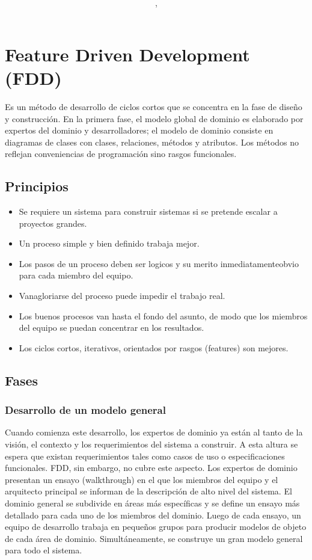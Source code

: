 \documentclass{article}
\author{\nombre , \carnet}
\title{\textbf{\Huge\titulo}}
\begin{document}
\maketitle
\section{Feature Driven Development (FDD)}
Es un método de desarrollo de ciclos cortos que se concentra en la fase
de diseño y construcción. En la primera fase, el modelo global de dominio es elaborado
por expertos del dominio y desarrolladores; el modelo de dominio consiste en diagramas
de clases con clases, relaciones, métodos y atributos. Los métodos no reflejan
conveniencias de programación sino rasgos funcionales.
\subsection{Principios}
	\begin{itemize}
		\item Se requiere un sistema para construir sistemas si
			se pretende escalar a proyectos grandes.
		\item Un proceso simple y bien definido trabaja mejor.
		\item Los pasos de un proceso deben ser logicos y su 
			merito inmediatamenteobvio para cada miembro
			del equipo.
		\item Vanagloriarse del proceso puede impedir el trabajo
			real.
		\item Los buenos procesos van hasta el fondo del asunto,
			de modo que los miembros del equipo se puedan
			concentrar en los resultados.
		\item Los ciclos cortos, iterativos, orientados por 
			rasgos (features) son mejores.
	\end{itemize}
\subsection{Fases}
\subsubsection{Desarrollo de un modelo general}
Cuando comienza este desarrollo, los expertos de
dominio ya están al tanto de la visión, el contexto y los requerimientos del sistema a
construir. A esta altura se espera que existan requerimientos tales como casos de uso
o especificaciones funcionales. FDD, sin embargo, no cubre este aspecto. Los
expertos de dominio presentan un ensayo (walkthrough) en el que los miembros del
equipo y el arquitecto principal se informan de la descripción de alto nivel del
sistema. El dominio general se subdivide en áreas más específicas y se define un
ensayo más detallado para cada uno de los miembros del dominio. Luego de cada
ensayo, un equipo de desarrollo trabaja en pequeños grupos para producir modelos de
objeto de cada área de dominio. Simultáneamente, se construye un gran modelo
general para todo el sistema.
\end{document}

